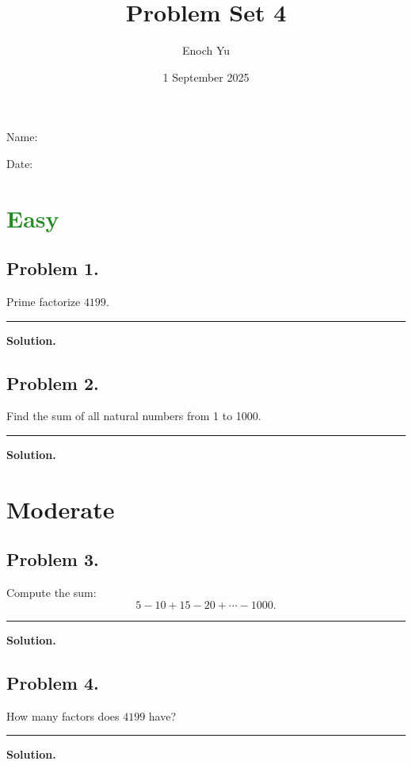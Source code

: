 \documentclass{article}
\title{Problem Set 4}
\author{Enoch Yu}
\date{1 September 2025}
\newcommand {\MyLine} {
    \smallskip \noindent\rule{\textwidth}{0.4pt} \smallskip
}
\begin{document}
Name:

Date:

\section*{\textcolor{ForestGreen}{Easy}}
\begin{minipage}[t][0.4\textheight][t]{\textwidth}
\subsection*{Problem 1.} %
{\color {Gray}
Prime factorize $4199$.
}

\MyLine

\textbf{Solution.}

\end{minipage}


\begin{minipage}[t][0.4\textheight][t]{\textwidth}
\subsection*{Problem 2.} %
{\color {Gray}
Find the sum of all natural numbers from 1 to 1000.
}

\MyLine

\textbf{Solution.}

\end{minipage}


\newpage
\section*{\textcolor{YellowOrange}{Moderate}}
\begin{minipage}[t][0.45\textheight][t]{\textwidth}
\subsection*{Problem 3.} %
{\color {Gray}
Compute the sum:
\[
5 - 10 + 15 - 20 + \cdots - 1000.
\]
}

\MyLine

\textbf{Solution.}

\end{minipage}

\begin{minipage}[t][0.45\textheight][t]{\textwidth}

\subsection*{Problem 4.} %
{\color {Gray}
How many factors does $4199$ have?
}

\MyLine

\textbf{Solution.}

\end{minipage}
\end{document}
